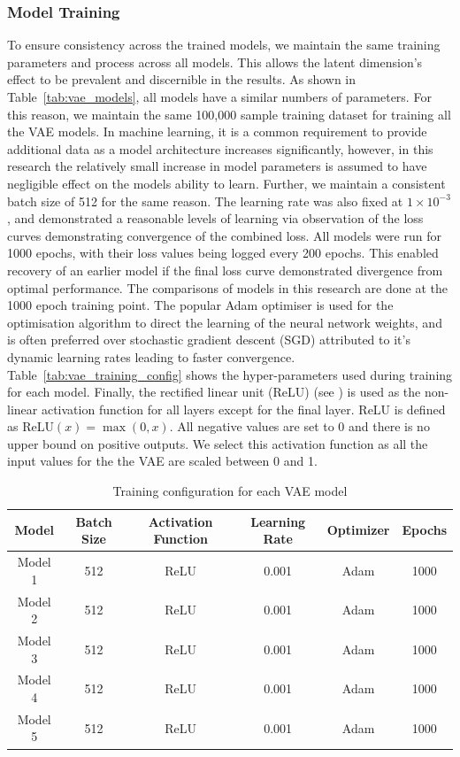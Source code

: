 \documentclass{article}
\begin{document}
\subsubsection{Model Training}\label{model_training}
To ensure consistency across the trained models, we maintain the same training parameters and process across all models. This allows the latent dimension’s effect to be prevalent and discernible in the results.  As shown in Table~\ref{tab:vae_models}, all models have a similar numbers of parameters. For this reason, we maintain the same 100,000 sample training dataset for training all the VAE models. In machine learning, it is a common requirement to provide additional data as a model architecture increases significantly, however, in this research the relatively small increase in model parameters is assumed to have negligible effect on the models ability to learn. Further, we maintain a consistent batch size of 512 for the same reason. The learning rate was also fixed at $1\times10^{-3}$, and demonstrated a reasonable levels of learning via observation of the loss curves demonstrating convergence of the combined loss. All models were run for 1000 epochs, with their loss values being logged every 200 epochs. This enabled recovery of an earlier model if the final loss curve demonstrated divergence from optimal performance. The comparisons of models in this research are done at the 1000 epoch training point. The popular Adam optimiser \citep{Kingma2014} is used for the optimisation algorithm to direct the learning of the neural network weights, and is often preferred over stochastic gradient descent (SGD) attributed to it's dynamic learning rates leading to faster convergence. Table~\ref{tab:vae_training_config} shows the hyper-parameters used during training for each model. Finally, the rectified linear unit (ReLU) (see \cite{FredAgarap2018}) is used as the non-linear activation function for all layers except for the final layer. ReLU is defined as $\text{ReLU}(x) = \max(0, x)$.  All negative values are set to 0 and there is no upper bound on positive outputs. We select this activation function as all the input values for the the VAE are scaled between 0 and 1.

\begin{table}[h]
\centering
\begin{tabular}{|c|c|c|c|c|c|}
\hline
\textbf{Model} & \textbf{Batch Size} & \textbf{Activation Function} & \textbf{Learning Rate} & \textbf{Optimizer} & \textbf{Epochs} \\
\hline
Model 1 & 512 & ReLU & 0.001 & Adam & 1000 \\
\hline
Model 2 & 512 & ReLU & 0.001 & Adam & 1000 \\
\hline
Model 3 & 512 & ReLU & 0.001 & Adam & 1000 \\
\hline
Model 4 & 512 & ReLU & 0.001 & Adam & 1000 \\
\hline
Model 5 & 512 & ReLU & 0.001 & Adam & 1000 \\
\hline
\end{tabular}
\caption{Training configuration for each VAE model}
\label{tab:GA_models}
\end{table}
\end{document}
